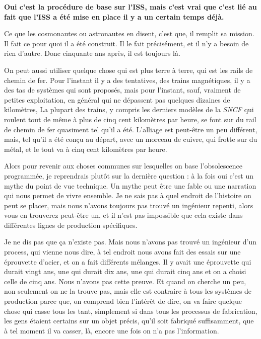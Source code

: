 \begin{small}
\vspace{1\baselineskip}

\textbf{Oui c'est la procédure de base sur l'ISS, mais c'est vrai que c'est lié au fait que l'ISS a été mise en place il y a un certain temps déjà.}

\vspace{1\baselineskip}

Ce que les cosmonautes ou astronautes en disent, c'est que, il remplit sa mission. Il fait ce pour quoi il a été construit. Il le fait précisément, et il n'y a besoin de rien d'autre. Donc cinquante ans après, il est toujours là. 

On peut aussi utiliser quelque chose qui est plus terre à terre, qui est les rails de chemin de fer. Pour l'instant il y a des tentatives, des trains magnétiques, il y a des tas de systèmes qui sont proposés, mais pour l'instant, sauf, vraiment de petites exploitation, en général qui ne dépassent pas quelques dizaines de kilomètres, La plupart des trains, y compris les derniers modèles de la \textit{SNCF} qui roulent tout de même à plus de cinq cent kilomètres par heure, se font sur du rail de chemin de fer quasiment tel qu'il a été. L'alliage est peut-être un peu différent, mais, tel qu'il a été conçu au départ, avec un morceau de cuivre, qui frotte sur du métal, et le tout va à  cinq cent kilomètres par heure. 

\smallbreak
Alors pour revenir aux choses communes sur lesquelles on base l'obsolescence programmée, je reprendrais plutôt sur la dernière question : à la fois oui c'est un mythe du point de vue technique. Un mythe peut être une fable ou une narration qui nous permet de vivre ensemble. Je ne sais pas à quel endroit de l'histoire on peut se placer, mais nous n'avons toujours pas trouvé un ingénieur repenti, alors vous en trouverez peut-être un, et il n'est pas impossible que cela existe dans différentes lignes de production spécifiques. 

Je ne dis pas que ça n'existe pas. Mais nous n'avons pas trouvé un ingénieur d'un process, qui vienne nous dire, à tel endroit nous avons fait des essais sur une éprouvette d'acier, et on a fait différents mélanges. Il y avait une éprouvette qui durait vingt ans, une qui durait dix ans, une qui durait cinq ans et on a choisi celle de cinq ans. Nous n'avons pas cette  preuve. Et quand on cherche un peu, non seulement on ne la trouve pas, mais elle est contraire à tous les systèmes de production parce que, on comprend bien l’intérêt de dire, on va faire quelque chose qui casse tous les tant, simplement si dans tous les processus de fabrication, les gens étaient certains sur un objet précis, qu'il soit fabriqué suffisamment, que à tel moment il va casser, là, encore une fois on n'a pas l'information.


\end{small}
